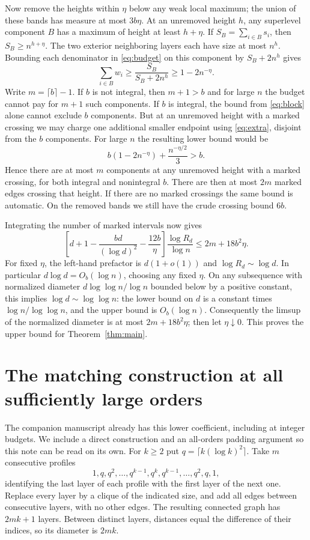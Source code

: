 \documentclass[10pt]{article}
\begin{document}
Now remove the heights within $\eta$ below any weak local maximum; the union of these bands has measure at most $3b\eta$. At an unremoved height $h$, any superlevel component $B$ has a maximum of height at least $h+\eta$. If $S_B=\sum_{i\in B}s_i$, then $S_B\ge n^{h+\eta}$. The two exterior neighboring layers each have size at most $n^h$. Bounding each denominator in \eqref{eq:budget} on this component by $S_B+2n^h$ gives
\begin{equation}\label{eq:block}
 \sum_{i\in B}w_i\ge\frac{S_B}{S_B+2n^h}\ge1-2n^{-\eta}.
\end{equation}
Write $m=\lceil b\rceil-1$. If $b$ is not integral, then $m+1>b$ and for large $n$ the budget cannot pay for $m+1$ such components. If $b$ is integral, the bound from \eqref{eq:block} alone cannot exclude $b$ components. But at an unremoved height with a marked crossing we may charge one additional smaller endpoint using \eqref{eq:extra}, disjoint from the $b$ components. For large $n$ the resulting lower bound would be
\[
 b(1-2n^{-\eta})+\frac{n^{-\eta/2}}3>b.
\]
Hence there are at most $m$ components at any unremoved height with a marked crossing, for both integral and nonintegral $b$. There are then at most $2m$ marked edges crossing that height. If there are no marked crossings the same bound is automatic. On the removed bands we still have the crude crossing bound $6b$.

Integrating the number of marked intervals now gives
\[
 \left[d+1-\frac{bd}{(\log d)^2}-\frac{12b}{\eta}\right]
 \frac{\log R_d}{\log n}\le 2m+18b^2\eta .
\]
For fixed $\eta$, the left-hand prefactor is $d(1+o(1))$ and $\log R_d\sim\log d$. In particular $d\log d=O_b(\log n)$, choosing any fixed $\eta$. On any subsequence with normalized diameter $d\log\log n/\log n$ bounded below by a positive constant, this implies $\log d\sim\log\log n$: the lower bound on $d$ is a constant times $\log n/\log\log n$, and the upper bound is $O_b(\log n)$. Consequently the limsup of the normalized diameter is at most $2m+18b^2\eta$; then let $\eta\downarrow0$. This proves the upper bound for Theorem~\ref{thm:main}.

\section{The matching construction at all sufficiently large orders}
The companion manuscript already has this lower coefficient, including at integer budgets. We include a direct construction and an all-orders padding argument so this note can be read on its own.
For $k\ge2$ put $q=\lceil k(\log k)^2\rceil$. Take $m$ consecutive profiles
\[
 1,q,q^2,\ldots,q^{k-1},q^k,q^{k-1},\ldots,q^2,q,1,
\]
identifying the last layer of each profile with the first layer of the next one. Replace every layer by a clique of the indicated size, and add all edges between consecutive layers, with no other edges. The resulting connected graph has $2mk+1$ layers. Between distinct layers, distances equal the difference of their indices, so its diameter is $2mk$.
\end{document}

